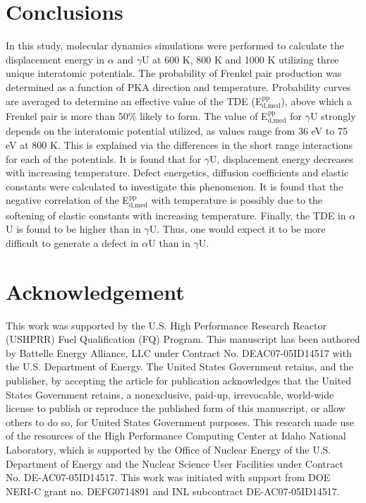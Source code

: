 \documentclass[review]{elsarticle}
\begin{document}
\section{Conclusions}

In this study, molecular dynamics simulations were performed to calculate the displacement energy in $\alpha$ and $\gamma$U at 600 K, 800 K and 1000 K utilizing three unique interatomic potentials. The probability of Frenkel pair production was determined as a function of PKA direction and temperature. Probability curves are averaged to determine an effective value of the TDE (E$^{\textrm{pp}}_{\textrm{d,med}}$), above which a Frenkel pair is more than 50$\%$ likely to form. The value of E$^{\textrm{pp}}_{\textrm{d,med}}$ for $\gamma$U strongly depends on the interatomic potential utilized, as values range from 36 eV to 75 eV at 800 K. This is explained via the differences in the short range interactions for each of the potentials. It is found that for $\gamma$U, displacement energy decreases with increasing temperature. Defect energetics, diffusion coefficients and elastic constants were calculated to investigate this phenomenon. It is found that the negative correlation of the E$^{\textrm{pp}}_{\textrm{d,med}}$ with temperature is possibly due to the softening of elastic constants with increasing temperature. Finally, the TDE in $\alpha$U is found to be higher than in $\gamma$U. Thus, one would expect it to be more difficult to generate a defect in $\alpha$U than in $\gamma$U.

\section{Acknowledgement}
This work was supported by the U.S. High Performance Research Reactor (USHPRR) Fuel Qualification (FQ) Program. This manuscript has been authored by Battelle Energy Alliance, LLC under Contract No. DEAC07-05ID14517 with the U.S. Department of Energy. The United States Government retains, and the publisher, by accepting the article for publication acknowledges that the United States Government retains, a nonexclusive, paid-up, irrevocable, world-wide license to publish or reproduce the published form of this manuscript, or allow others to do so, for United States Government purposes. This research made use of the resources of the High Performance Computing Center at Idaho National Laboratory, which is supported by the Office of Nuclear Energy of the U.S. Department of Energy and the Nuclear Science User Facilities under Contract No. DE-AC07-05ID14517. This work was initiated with support from DOE NERI-C grant no. DEFG0714891 and INL subcontract DE-AC07-05ID14517.

\end{document}
